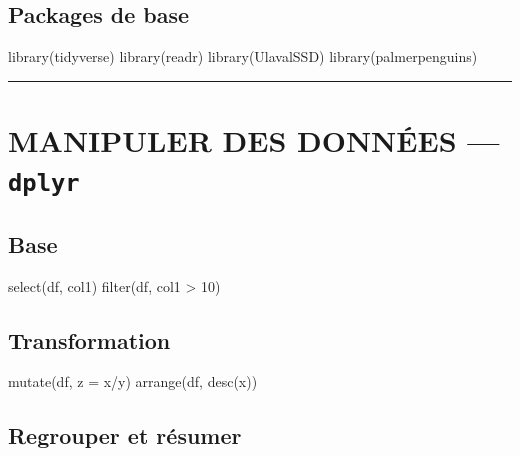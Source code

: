 \documentclass[
  french,
  8pt,
  letterpaper,
  DIV=11,
  numbers=noendperiod]{scrartcl}
\newenvironment{Shaded}{\begin{snugshade}}{\end{snugshade}}
\newcommand{\AttributeTok}[1]{\textcolor[rgb]{0.40,0.45,0.13}{#1}}
\newcommand{\DecValTok}[1]{\textcolor[rgb]{0.68,0.00,0.00}{#1}}
\newcommand{\FunctionTok}[1]{\textcolor[rgb]{0.28,0.35,0.67}{#1}}
\newcommand{\NormalTok}[1]{\textcolor[rgb]{0.00,0.23,0.31}{#1}}
\newcommand{\SpecialCharTok}[1]{\textcolor[rgb]{0.37,0.37,0.37}{#1}}
\begin{document}
\subsection{Packages de base}\label{packages-de-base}

\begin{Shaded}
\begin{Highlighting}[]
\FunctionTok{library}\NormalTok{(tidyverse)}
\FunctionTok{library}\NormalTok{(readr)}
\FunctionTok{library}\NormalTok{(UlavalSSD)}
\FunctionTok{library}\NormalTok{(palmerpenguins)}
\end{Highlighting}
\end{Shaded}

\begin{center}\rule{0.5\linewidth}{0.5pt}\end{center}

\section{\texorpdfstring{ MANIPULER DES DONNÉES ---
\texttt{dplyr}}{ MANIPULER DES DONNÉES --- dplyr}}\label{manipuler-des-donnuxe9es-dplyr}

\subsection{Base}\label{base}

\begin{Shaded}
\begin{Highlighting}[]
\FunctionTok{select}\NormalTok{(df, col1)}
\FunctionTok{filter}\NormalTok{(df, col1 }\SpecialCharTok{\textgreater{}} \DecValTok{10}\NormalTok{)}
\end{Highlighting}
\end{Shaded}

\subsection{Transformation}\label{transformation}

\begin{Shaded}
\begin{Highlighting}[]
\FunctionTok{mutate}\NormalTok{(df, }\AttributeTok{z =}\NormalTok{ x}\SpecialCharTok{/}\NormalTok{y)}
\FunctionTok{arrange}\NormalTok{(df, }\FunctionTok{desc}\NormalTok{(x))}
\end{Highlighting}
\end{Shaded}

\subsection{Regrouper et résumer}\label{regrouper-et-ruxe9sumer}
\end{document}
